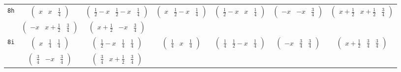 \documentclass[fleqn,9pt,landscape]{jsarticle}
\begin{document}
\begin{center}
\begin{longtable}{ccccccc}
{\tt 8h} & $ \begin{pmatrix} x & x & \frac{1}{4} \end{pmatrix} $ & $ \begin{pmatrix} \frac{1}{2} - x & \frac{1}{2} - x & \frac{1}{4} \end{pmatrix} $ & $ \begin{pmatrix} x & \frac{1}{2} - x & \frac{1}{4} \end{pmatrix} $ & $ \begin{pmatrix} \frac{1}{2} - x & x & \frac{1}{4} \end{pmatrix} $ & $ \begin{pmatrix} - x & - x & \frac{3}{4} \end{pmatrix} $ & $ \begin{pmatrix} x + \frac{1}{2} & x + \frac{1}{2} & \frac{3}{4} \end{pmatrix} $ \\
& $ \begin{pmatrix} - x & x + \frac{1}{2} & \frac{3}{4} \end{pmatrix} $ & $ \begin{pmatrix} x + \frac{1}{2} & - x & \frac{3}{4} \end{pmatrix} $ & $  $ & $  $ & $  $ & $  $ \\ \hline
{\tt 8i} & $ \begin{pmatrix} x & \frac{1}{4} & \frac{1}{4} \end{pmatrix} $ & $ \begin{pmatrix} \frac{1}{2} - x & \frac{1}{4} & \frac{1}{4} \end{pmatrix} $ & $ \begin{pmatrix} \frac{1}{4} & x & \frac{1}{4} \end{pmatrix} $ & $ \begin{pmatrix} \frac{1}{4} & \frac{1}{2} - x & \frac{1}{4} \end{pmatrix} $ & $ \begin{pmatrix} - x & \frac{3}{4} & \frac{3}{4} \end{pmatrix} $ & $ \begin{pmatrix} x + \frac{1}{2} & \frac{3}{4} & \frac{3}{4} \end{pmatrix} $ \\
& $ \begin{pmatrix} \frac{3}{4} & - x & \frac{3}{4} \end{pmatrix} $ & $ \begin{pmatrix} \frac{3}{4} & x + \frac{1}{2} & \frac{3}{4} \end{pmatrix} $ & $  $ & $  $ & $  $ & $  $ \\ \hline

\end{longtable}
\end{center}
\end{document}
